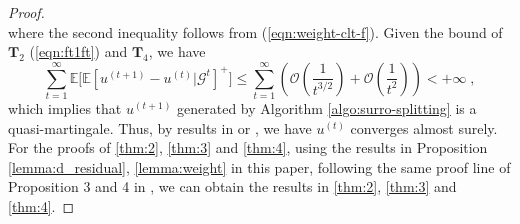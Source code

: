 \documentclass[final]{siamart1116}
\def \co {\mathcal{O}}
\def \E  {\mathbb{E}}
\def \G  {\mathcal{G}}
\def \T {\mathbf{T}}
\begin{document}
\begin{proof}
\[ \]
where the second inequality follows from (\ref{eqn:weight-clt-f}). Given the bound of $\T_2$ (\ref{eqn:ft1ft}) and $\T_4$, we have
\[
\sum_{t=1}^\infty \E\big[\E[u^{(t+1)}-u^{(t)}|\G^t]^{+}\big] \leq \sum_{t=1}^\infty \left( \co\left(\frac{1}{t^{3/2}}\right) + \co\left(\frac{1}{t^2}\right) \right)< + \infty \;,
\]
which implies that $u^{(t+1)}$ generated by Algorithm \ref{algo:surro-splitting}
is a quasi-martingale. Thus, by results in \cite[Sec. 4.4]{bottou1998online} or \cite[Theorem 6]{mairal-2010-online}, we have $u^{(t)}$ converges almost surely. \\ For the proofs of \ref{thm:2}, \ref{thm:3} and \ref{thm:4}, using the results in Proposition \ref{lemma:d_residual}, \ref{lemma:weight} in this paper, following the same proof line of Proposition 3 and 4 in \cite{mairal-2010-online}, we can obtain the results in \ref{thm:2}, \ref{thm:3} and \ref{thm:4}.
\end{proof}



\end{document}
